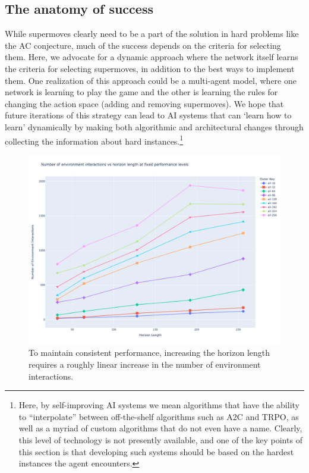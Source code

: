 \subsection{The anatomy of success}

While supermoves clearly need to be a part of the solution in hard problems like the AC conjecture, much of the success depends on the criteria for selecting them. Here, we advocate for a dynamic approach where the network itself learns the criteria for selecting supermoves, in addition to the best ways to implement them. One realization of this approach could be a multi-agent model, where one network is learning to play the game and the other is learning the rules for changing the action space (adding and removing supermoves). We hope that future iterations of this strategy can lead to AI systems that can `learn how to learn' dynamically by making both algorithmic and architectural changes through collecting the information about hard instances.\footnote{Here, by self-improving AI systems we mean algorithms that have the ability to ``interpolate'' between off-the-shelf algorithms such as A2C and TRPO, as well as a myriad of custom algorithms that do not even have a name. Clearly, this level of technology is not presently available, and one of the key points of this section is that developing such systems should be based on the hardest instances the agent encounters.}

\begin{figure}
	\centering
	\includegraphics[scale=0.3]{fig/env_vs_horizon.png}
	\caption{To maintain consistent performance, increasing the horizon length requires a roughly linear increase in the number of environment interactions.}
	\label{fig:env_vs_horizon}
\end{figure}

